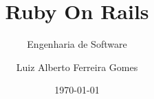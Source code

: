 \author{Luiz Alberto Ferreira Gomes}
\title{Ruby On Rails}
\subtitle{Engenharia de Software}
\date{\today}
